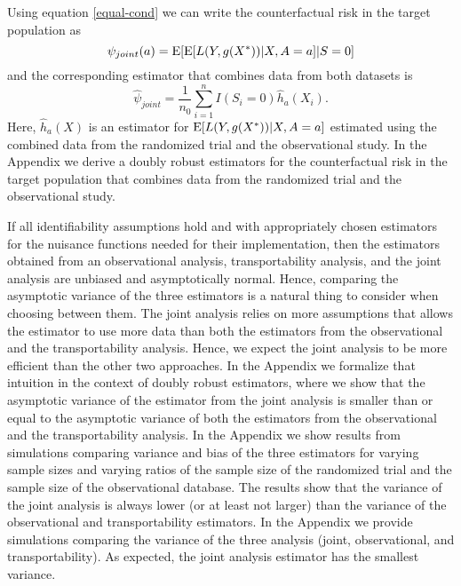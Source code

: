 \documentclass[11pt]{article}
\DeclareMathOperator{\E}{\textnormal{\mbox{E}}}
\begin{document}
Using equation \eqref{equal-cond} we can write the counterfactual risk in the target population as 
\[
\psi_{joint}(a) = \E[\E[L(Y, g(X^*)) |X, A=a]| S=0]
\]
and the corresponding estimator that combines data from both datasets is 
\[
\widehat\psi_{joint} = \frac{1}{n_0} \sum_{i=1}^n I(S_i=0 ) \widehat h_{a}(X_i).
\]
Here, $\widehat h_{a}(X)$ is an estimator for $\E[L(Y, g(X^*)) |X, A=a]$ estimated using the combined data from the randomized trial and the observational study. In the Appendix we derive a doubly robust estimators for the counterfactual risk in the target population that combines data from the randomized trial and the observational study. 

If all identifiability assumptions hold and with appropriately chosen estimators for the nuisance functions needed for their implementation, then the estimators obtained from an observational analysis, transportability analysis, and the joint analysis are unbiased and asymptotically normal. Hence, comparing the asymptotic variance of the three estimators is a natural thing to consider when choosing between them. The joint analysis relies on more assumptions that allows the estimator to use more data than both the estimators from the observational and the transportability analysis. Hence, we expect the joint analysis to be more efficient than the other two approaches. In the Appendix we formalize that intuition in the context of doubly robust estimators, where we show that the asymptotic variance of the estimator from the joint analysis is smaller than or equal to the asymptotic variance of both the estimators from the observational and the transportability analysis. In the Appendix we show results from simulations comparing variance and bias of the three estimators for varying sample sizes and varying ratios of the sample size of the randomized trial and the sample size of the observational database. The results show that the variance of the joint analysis is always lower (or at least not larger) than the variance of the observational and transportability estimators. In the Appendix we provide simulations comparing the variance of the three analysis (joint, observational, and transportability). As expected, the joint analysis estimator has the smallest variance.


\end{document}
